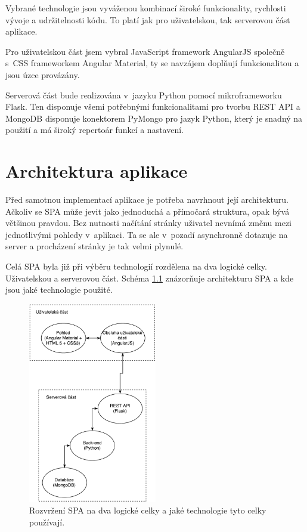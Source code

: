 Vybrané technologie jsou vyváženou kombinací široké funkcionality, rychlosti vývoje a udržitelnosti kódu. To platí jak pro uživatelskou, tak serverovou část aplikace.

Pro uživatelskou část jsem vybral JavaScript framework AngularJS společně s~CSS frameworkem Angular Material, ty se navzájem doplňují funkcionalitou a jsou úzce provázány.

Serverová část bude realizována v~jazyku Python pomocí mikroframeworku Flask. Ten disponuje všemi potřebnými funkcionalitami pro tvorbu REST API a MongoDB disponuje konektorem PyMongo pro jazyk Python, který je snadný na použití a má široký repertoár funkcí a nastavení.

\chapter{Architektura aplikace}
\label{architektura}

Před samotnou implementací aplikace je potřeba navrhnout její architekturu. Ačkoliv se SPA může jevit jako jednoduchá a přímočará struktura, opak bývá většinou pravdou. Bez nutnosti načítání stránky uživatel nevnímá změnu mezi jednotlivými pohledy v~aplikaci. Ta se ale v~pozadí asynchronně dotazuje na server a procházení stránky je tak velmi plynulé.

Celá SPA byla již při výběru technologií rozdělena na dva logické celky. Uživatelskou a serverovou část. Schéma \ref{fig:system} znázorňuje architekturu SPA a kde jsou jaké technologie použité.

\begin{figure}[ht]
    \centering
    \includegraphics[width=0.5\textwidth]{fig/SPA.pdf}
    \caption{Rozvržení SPA na dva logické celky a jaké technologie tyto celky používají.} \label{fig:system}
\end{figure}

